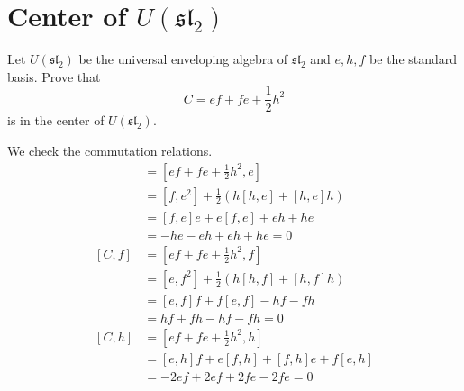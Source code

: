 \documentclass[11pt, headheight=30pt]{scrartcl}
\begin{document}
\section{Center of $U(\mathfrak{sl}_2)$}

\begin{prob*}
Let $U(\mathfrak{sl}_2)$ be the universal enveloping algebra of $\mathfrak{sl}_2$ and $e, h, f$ be the standard basis. Prove that
\[C = ef + fe + \frac{1}{2} h^2\]
is in the center of $U(\mathfrak{sl}_2)$.

\end{prob*}
We check the commutation relations.
\begin{align*}
    [C, e] &= [ef + fe + \frac{1}{2} h^2, e] \\
    &= [f,e^2] + \frac12 (h[h,e] + [h,e]h) \\
    &= [f,e]e + e[f,e] + eh +he\\
    &= -he - eh + eh + he = 0\\
    [C, f] &= [ef + fe + \frac{1}{2} h^2, f] \\
    &= [e,f^2] + \frac12 (h[h,f] + [h,f]h) \\
    &= [e,f]f + f[e,f] -hf - fh\\
    &= hf + fh - hf - fh = 0\\
    [C, h] &= [ef + fe + \frac{1}{2} h^2, h] \\
    &= [e,h]f + e[f,h] + [f,h]e + f[e,h] \\
    &= -2ef + 2ef + 2fe - 2fe = 0
\end{align*}
\end{document}
